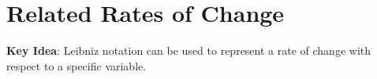 \documentclass[main]{subfiles}
\begin{document}
\section{Related Rates of Change} \label{ws1-2}








\textbf{Key Idea}: Leibniz notation can be used to represent a rate of change with respect to a specific variable.
\end{document}
